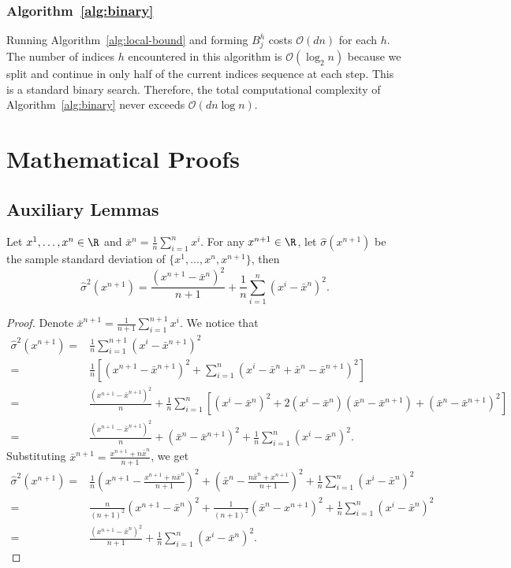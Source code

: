\subsubsection{Algorithm~\ref{alg:binary}} \label{app:backward-binary}
Running Algorithm~\ref{alg:local-bound} and forming $B^h_j$ costs $\mathcal{O}(dn)$ for each $h$. The number of indices $h$ encountered in this algorithm is $\mathcal{O}(\log_2{n})$ because we split and continue in only half of the current indices sequence at each step. This is a standard binary search. Therefore, the total computational complexity of Algorithm~\ref{alg:binary} never exceeds $\mathcal{O}(dn\log{n})$.

\clearpage

\section{Mathematical Proofs} 
\label{app:proofs}

\subsection{Auxiliary Lemmas}\label{app:proofs-lemmas}

\begin{lemma}\label{lem:1}
    Let $x^1,\ldots,x^n \in \R$ and $\bar{x}^n = \frac{1}{n}\sum^n_{i=1}x^i$. For any $x^{n+1}\in \R$, let $\hat\sigma(x^{n+1})$ be the sample standard deviation of $\{x^1,\ldots,x^n, x^{n+1}\}$, then
    \[
    \hat\sigma^2(x^{n+1}) = \frac{(x^{n+1}-\bar{x}^{n})^2}{n+1}+\frac{1}{n}\sum^n_{i=1}(x^i-\bar{x}^{n})^2.
    \]
\end{lemma}
\begin{proof}
    Denote $\bar{x}^{n+1} = \frac{1}{n+1}\sum^{n+1}_{i=1}x^i$. We notice that
\begin{align*}
    \hat\sigma^2(x^{n+1}) = &\frac{1}{n}\sum^{n+1}_{i=1}(x^i-\bar{x}^{n+1})^2\\
    = &\frac{1}{n} \left[ (x^{n+1}-\bar{x}^{n+1})^2+\sum^n_{i=1}(x^i-\bar{x}^{n}+\bar{x}^{n}-\bar{x}^{n+1})^2 \right]\\
    = &\frac{(x^{n+1}-\bar{x}^{n+1})^2}{n}+\frac{1}{n}\sum^n_{i=1}\left[(x^i-\bar{x}^{n})^2+2(x^i-\bar{x}^n)(\bar{x}^n-\bar{x}^{n+1})+(\bar{x}^{n}-\bar{x}^{n+1})^2\right]\\
    = &\frac{(x^{n+1}-\bar{x}^{n+1})^2}{n}+(\bar{x}^{n}-\bar{x}^{n+1})^2+\frac{1}{n}\sum^n_{i=1}(x^i-\bar{x}^{n})^2.
\end{align*}
Substituting $\bar{x}^{n+1} = \frac{x^{n+1}+n\bar{x}^n}{n+1}$, we get
\begin{align*}    
    \hat\sigma^2(x^{n+1}) = &\frac{1}{n}\left(x^{n+1}-\frac{x^{n+1}+n\bar{x}^n}{n+1}\right)^2+\left(\bar{x}^n-\frac{n\bar{x}^n+x^{n+1}}{n+1}\right)^2+\frac{1}{n}\sum^n_{i=1}(x^i-\bar{x}^{n})^2\\
    = &\frac{n}{(n+1)^2}(x^{n+1}-\bar{x}^n)^2+\frac{1}{(n+1)^2}(\bar{x}^n-x^{n+1})^2+\frac{1}{n}\sum^n_{i=1}(x^i-\bar{x}^{n})^2\\
    = &\frac{(x^{n+1}-\bar{x}^{n})^2}{n+1}+\frac{1}{n}\sum^n_{i=1}(x^i-\bar{x}^{n})^2.
\end{align*}
\end{proof}

